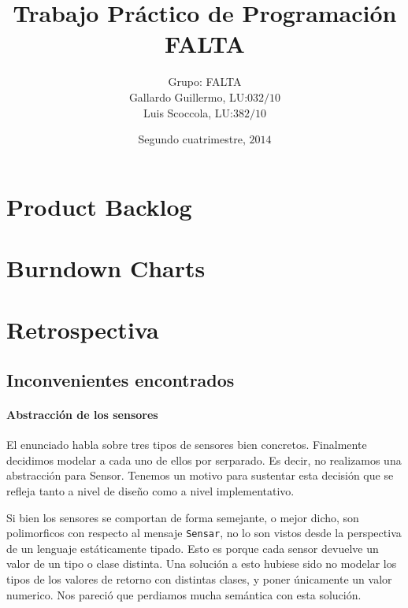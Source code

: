 \documentclass{article}
\begin{document}
  \title{Trabajo Pr\'actico de Programaci\'on FALTA}
  \date{Segundo cuatrimestre, $2014$}
  \author{Grupo: FALTA \\ Gallardo Guillermo, LU:$032/10$\\ Luis Scoccola, LU:$382/10$}

  \maketitle
 
  \newpage

  \section{Product Backlog}

  

  \section{Burndown Charts}

  \section{Retrospectiva}

    \subsection{Inconvenientes encontrados}
    \paragraph{Abstracci\'on de los sensores}
    El enunciado habla sobre tres tipos de sensores bien concretos. Finalmente
    decidimos modelar a cada uno de ellos por serparado. Es decir, no realizamos
    una abstracci\'on para Sensor. Tenemos un motivo para sustentar esta decisi\'on
    que se refleja tanto a nivel de dise\~no como a nivel implementativo.

    Si bien los sensores se comportan de forma semejante,
    o mejor dicho, son polimorficos con respecto al mensaje \texttt{Sensar},
    no lo son vistos desde la perspectiva de un lenguaje est\'aticamente tipado.
    Esto es porque cada sensor devuelve un valor de un tipo o clase distinta.
    Una soluci\'on a esto hubiese sido no modelar los tipos de los valores de
    retorno con distintas clases, y poner \'unicamente un valor numerico. Nos
    pareci\'o que perdiamos mucha sem\'antica con esta soluci\'on.
\end{document}
